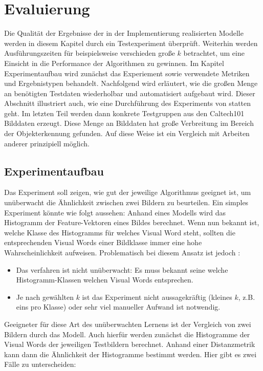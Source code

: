 \chapter{Evaluierung}

Die Qualität der Ergebnisse der in der Implementierung realisierten Modelle werden in diesem Kapitel durch ein Testexperiment überprüft. Weiterhin werden Ausführungszeiten für beispielsweise verschieden große $k$ betrachtet, um eine Einsicht in die Performance der Algorithmen zu gewinnen.
Im Kapitel Experimentaufbau wird zunächst das Experiement sowie verwendete Metriken und Ergebnistypen behandelt. Nachfolgend wird erläutert, wie die großen Menge an benötigten Testdaten wiederholbar und automatisiert aufgebaut wird. Dieser Abschnitt illustriert auch, wie eine Durchführung des Experiments von statten geht. Im letzten Teil werden dann konkrete Testgruppen aus den Caltech101 \cite{cal2004} Bilddaten erzeugt. Diese Menge an Bilddaten hat große Verbreitung im Bereich der Objekterkennung gefunden. Auf diese Weise ist ein Vergleich mit Arbeiten anderer prinzipiell möglich.

\section{Experimentaufbau}

Das Experiment soll zeigen, wie gut der jeweilige Algorithmus geeignet ist, um unüberwacht die Ähnlichkeit zwischen zwei Bildern zu beurteilen. Ein simples Experiment könnte wie folgt aussehen: Anhand eines Modells wird das Histogramm der Feature-Vektoren eines Bildes berechnet. Wenn nun bekannt ist, welche Klasse des Histogramms für welches Visual Word steht, sollten die entsprechenden Visual Words einer Bildklasse immer eine hohe Wahrscheinlichkeit aufweisen. Problematisch bei diesem Ansatz ist jedoch :

\begin{itemize}
	\item Das verfahren ist nicht unüberwacht: Es muss bekannt seine welche Histogramm-Klassen welchen Visual Words entsprechen. 
	\item Je nach gewählten $k$ ist das Experiment nicht aussagekräftig (kleines $k$, z.B. eins pro Klasse) oder sehr viel manueller Aufwand ist notwendig.
\end{itemize}

Geeigneter für diese Art des unüberwachten Lernens ist der Vergleich von zwei Bildern durch das Modell. Auch hierfür werden zunächst die Histogramme der Visual Words der jeweiligen Testbildern berechnet. Anhand einer Distanzmetrik kann dann die Ähnlichkeit der Histogramme bestimmt werden. Hier gibt es zwei Fälle zu unterscheiden:

